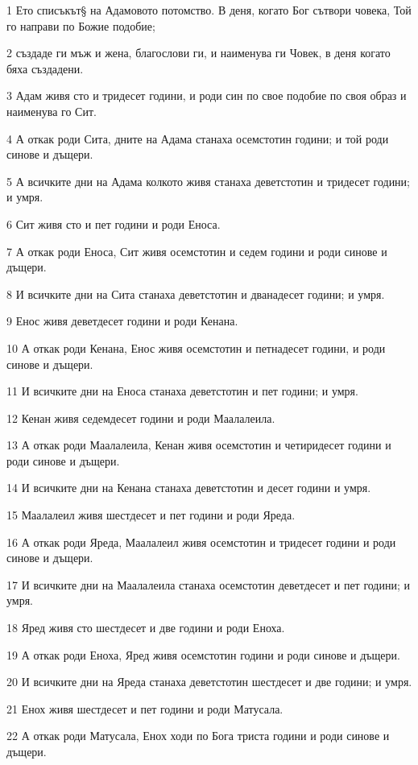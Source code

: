 \par 1 Ето списъкът§ на Адамовото потомство. В деня, когато Бог сътвори човека, Той го направи по Божие подобие;
\par 2 създаде ги мъж и жена, благослови ги, и наименува ги Човек, в деня когато бяха създадени.
\par 3 Адам живя сто и тридесет години, и роди син по свое подобие по своя образ и наименува го Сит.
\par 4 А откак роди Сита, дните на Адама станаха осемстотин години; и той роди синове и дъщери.
\par 5 А всичките дни на Адама колкото живя станаха деветстотин и тридесет години; и умря.
\par 6 Сит живя сто и пет години и роди Еноса.
\par 7 А откак роди Еноса, Сит живя осемстотин и седем години и роди синове и дъщери.
\par 8 И всичките дни на Сита станаха деветстотин и дванадесет години; и умря.
\par 9 Енос живя деветдесет години и роди Кенана.
\par 10 А откак роди Кенана, Енос живя осемстотин и петнадесет години, и роди синове и дъщери.
\par 11 И всичките дни на Еноса станаха деветстотин и пет години; и умря.
\par 12 Кенан живя седемдесет години и роди Маалалеила.
\par 13 А откак роди Маалалеила, Кенан живя осемстотин и четиридесет години и роди синове и дъщери.
\par 14 И всичките дни на Кенана станаха деветстотин и десет години и умря.
\par 15 Маалалеил живя шестдесет и пет години и роди Яреда.
\par 16 А откак роди Яреда, Маалалеил живя осемстотин и тридесет години и роди синове и дъщери.
\par 17 И всичките дни на Маалалеила станаха осемстотин деветдесет и пет години; и умря.
\par 18 Яред живя сто шестдесет и две години и роди Еноха.
\par 19 А откак роди Еноха, Яред живя осемстотин години и роди синове и дъщери.
\par 20 И всичките дни на Яреда станаха деветстотин шестдесет и две години; и умря.
\par 21 Енох живя шестдесет и пет години и роди Матусала.
\par 22 А откак роди Матусала, Енох ходи по Бога триста години и роди синове и дъщери.
